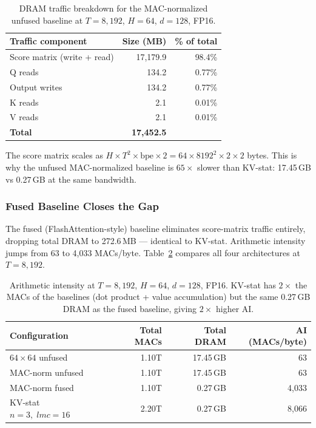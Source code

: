 \documentclass[11pt]{article}
\begin{document}
\begin{table}[H]
\centering
\caption{DRAM traffic breakdown for the MAC-normalized unfused baseline
at \(T = 8{,}192\), \(H=64\), \(d=128\), FP16.}
\label{tab:dram_breakdown}
\begin{tabular}{lrr}
\toprule
Traffic component & Size (MB) & \% of total \\
\midrule
Score matrix (write + read) & 17,179.9 & 98.4\% \\
Q reads                     &    134.2 &  0.77\% \\
Output writes               &    134.2 &  0.77\% \\
K reads                     &      2.1 &  0.01\% \\
V reads                     &      2.1 &  0.01\% \\
\midrule
\textbf{Total}              & \textbf{17,452.5} & \\
\bottomrule
\end{tabular}
\end{table}

The score matrix scales as
\(H \times T^2 \times \text{bpe} \times 2 = 64 \times 8192^2 \times 2 \times 2\)
bytes.
This is why the unfused MAC-normalized baseline is \(65\times\)
slower than KV-stat: 17.45\,GB vs 0.27\,GB at the same bandwidth.

\subsubsection*{Fused Baseline Closes the Gap}

The fused (FlashAttention-style) baseline eliminates score-matrix
traffic entirely, dropping total DRAM to 272.6\,MB --- identical
to KV-stat.
Arithmetic intensity jumps from 63 to 4,033 MACs/byte.
Table~\ref{tab:ai_comparison} compares all four architectures
at \(T = 8{,}192\).

\begin{table}[H]
\centering
\caption{Arithmetic intensity at \(T = 8{,}192\), \(H=64\), \(d=128\), FP16.
KV-stat has \(2\times\) the MACs of the baselines (dot product + value accumulation)
but the same 0.27\,GB DRAM as the fused baseline, giving \(2\times\) higher AI.}
\label{tab:ai_comparison}
\begin{tabular}{lrrr}
\toprule
Configuration & Total MACs & Total DRAM & AI (MACs/byte) \\
\midrule
\(64 \times 64\) unfused    & 1.10T & 17.45\,GB & 63 \\
MAC-norm unfused            & 1.10T & 17.45\,GB & 63 \\
MAC-norm fused              & 1.10T &  0.27\,GB & 4,033 \\
KV-stat \(n=3,\;lmc=16\)   & 2.20T &  0.27\,GB & 8,066 \\
\bottomrule
\end{tabular}
\end{table}
\end{document}
